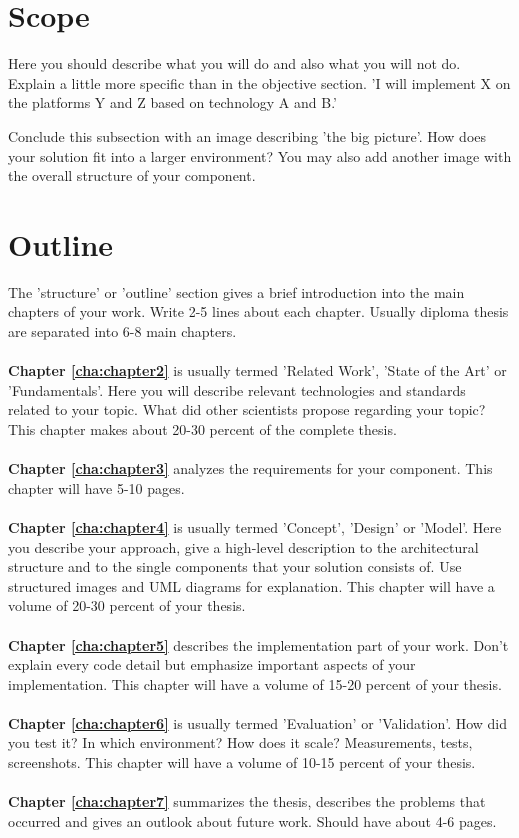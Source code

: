 \section{Scope\label{sec:scope}}

Here you should describe what you will do and also what you will not do. Explain a little
more specific than in the objective section. 'I will implement X on the platforms Y and Z
based on technology A and B.'

Conclude this subsection with an image describing 'the big picture'. How does your solution
fit into a larger environment? You may also add another image with the overall structure of
your component.

\section{Outline\label{sec:outline}}

The 'structure' or 'outline' section gives a brief introduction into the main chapters of
your work. Write 2-5 lines about each chapter. Usually diploma thesis are separated into
6-8 main chapters.\\
\\
\textbf{Chapter \ref{cha:chapter2}} is usually termed 'Related Work', 'State of the Art'
or 'Fundamentals'. Here you will describe relevant technologies and standards related
to your topic. What did other scientists propose regarding your topic? This chapter makes
about 20-30 percent of the complete thesis.\\
\\
\textbf{Chapter \ref{cha:chapter3}} analyzes the requirements for your component. This
chapter will have 5-10 pages.\\
\\
\textbf{Chapter \ref{cha:chapter4}} is usually termed 'Concept', 'Design' or 'Model'.
Here you describe your approach, give a high-level description to the architectural
structure and to the single components that your solution consists of. Use structured
images and UML diagrams for explanation. This chapter will have a volume of 20-30
percent of your thesis.\\
\\
\textbf{Chapter \ref{cha:chapter5}} describes the implementation part of your work. Don't
explain every code detail but emphasize important aspects of your implementation. This
chapter will have a volume of 15-20 percent of your thesis.\\
\\
\textbf{Chapter \ref{cha:chapter6}} is usually termed 'Evaluation' or 'Validation'. How
did you test it? In which environment? How does it scale? Measurements, tests, screenshots.
This chapter will have a volume of 10-15 percent of your thesis.\\
\\
\textbf{Chapter \ref{cha:chapter7}} summarizes the thesis, describes the problems that
occurred and gives an outlook about future work. Should have about 4-6 pages.
